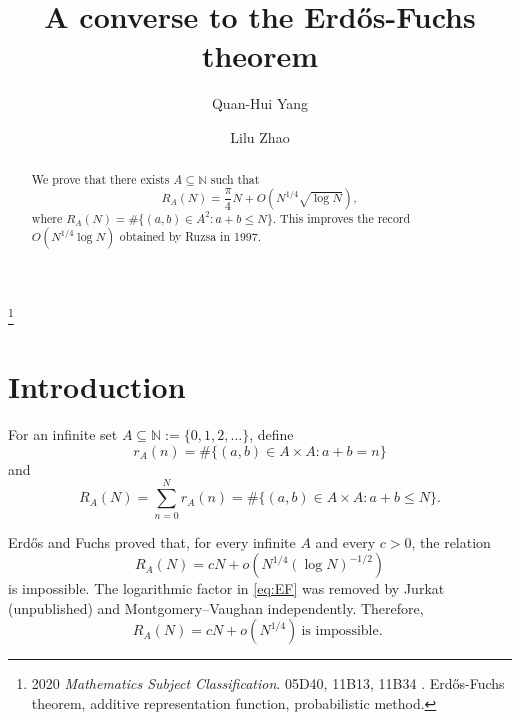 \documentclass[12pt,reqno]{amsart}
\theoremstyle{plain}
\theoremstyle{definition}
\newcommand{\N}{\mathbb N}
\begin{document}
\medskip

\title[{A converse to the Erd\H{o}s-Fuchs theorem}]{A converse to the Erd\H{o}s-Fuchs theorem}

\author{Quan-Hui Yang}
\address[Quan-Hui Yang]{Ministry of Education Key Laboratory for NSLSCS, School of Mathematical Sciences, Nanjing Normal University, Nanjing 210023, China}
\author{Lilu Zhao}
\address[Lilu Zhao]
{School of Mathematical Sciences, University of Science and Technology of China, Hefei 230026, China}

\begin{abstract}We prove that there exists $A\subseteq \N$ such that
\[
 R_A(N)=\frac{\pi}{4}N+
 O\!\left(N^{1/4}\sqrt{\log N}\right),
\]
where
$R_A(N)=\#\{(a,b)\in A^2:a+b\le N\}$. 
This improves the record
$O(N^{1/4}\log N)$ obtained by Ruzsa in 1997.
\end{abstract}
\thanks{2020 {\it Mathematics Subject Classification}. 05D40, 11B13, 11B34
\newline{}. Erd\H{o}s-Fuchs theorem, additive representation function, probabilistic method.
}

\maketitle


\section{Introduction}
\label{sec:intro}


\setcounter{equation}{0}

For an infinite set $A\subseteq\N:=\{0,1,2,\ldots\}$, define
\begin{equation*}
 r_A(n)=\#\{(a,b)\in A\times A:a+b=n\}
\end{equation*}and
\begin{equation}\label{eq:RN}
 R_A(N)=\sum_{n=0}^{N}r_A(n)
       =\#\{(a,b)\in A\times A:a+b\le N\}.
\end{equation}

Erd\H{o}s and Fuchs \cite{EF1956} proved that, for every infinite $A$ and
every $c>0$, the relation
\begin{equation}\label{eq:EF}
 R_A(N)=cN+o\!\left(N^{1/4}(\log N)^{-1/2}\right)
\end{equation}
is impossible. The logarithmic factor in \eqref{eq:EF} was removed by Jurkat (unpublished) and
Montgomery--Vaughan \cite{MV1990} independently. Therefore,
\begin{equation}\label{J-MV}
 R_A(N)=cN+o(N^{1/4})\ \textrm{is impossible. }
\end{equation}
\end{document}
